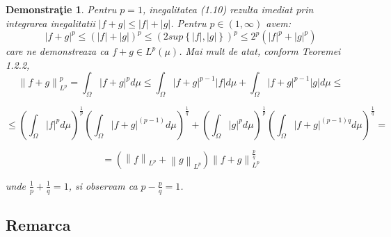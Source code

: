 \documentclass[a4paper,12pt,oneside]{report}
\newtheorem{demonstration}{Demonstra\c tie}
\begin{document}
\begin{demonstration}
Pentru \(p  = 1\), inegalitatea (1.10) rezulta imediat prin integrarea inegalitatii \(\left | f + g \right |\leq \left | f \right | + \left | g \right |\). Pentru \(p \in \left ( 1 , \infty  \right )\) avem:
\begin{displaymath}
  \left | f + g  \right |^{p}\leq \left ( \left | f \right | +\left | g \right |\right )^{p}\leq \left ( 2 sup\left \{ \left | f \right |,\left | g \right | \right \} \right )^{p}\leq 2^{p}\left ( \left | f \right |^{p}  + \left | g \right |^{p}\right )
\end{displaymath}
care ne demonstreaza ca \(f + g \in L^{p}\left ( \mu  \right )\). Mai mult de atat, conform Teoremei 1.2.2, 
\begin{displaymath}
  \left \| f + g  \right \|_{L^{p}}^{p} = \int_{\Omega }\left | f + g \right |^{p}d\mu \leq \int_{\Omega }\left | f + g \right |^{p - 1}\left | f \right |d\mu + \int_{\Omega }\left | f + g  \right |^{p - 1}\left | g \right |d\mu \leq 
\end{displaymath}

\begin{displaymath}
  \leq\left ( \int_{\Omega }\left | f \right |^{p}d\mu  \right )^{\frac{1}{p}}\left ( \int_{\Omega }\left | f + g  \right | ^{\left ( p - 1 \right )}d\mu \right )^{\frac{1}{q}}+ \left ( \int_{\Omega }\left | g \right |^{p}d\mu  \right )^{\frac{1}{p}}\left ( \int_{\Omega} \left | f + g \right |^{\left ( p - 1 \right )q}d\mu \right )^{\frac{1}{q}}= 
\end{displaymath}

\begin{displaymath}
  =\left ( \left \| f \right \|_{L^{p}} + \left \| g \right \|_{L^{p}} \right )\left \| f + g  \right \|_{L^{p}}^{\frac{p}{q}}
\end{displaymath}



unde \(\frac{1}{p} + \frac{1}{q} = 1\), si observam ca \(p - \frac{p}{q} = 1\). 	
\end{demonstration}


\subsection{Remarca}
\end{document}
